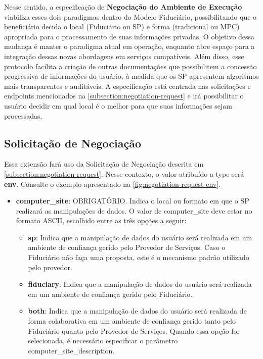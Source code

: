Nesse sentido, a especificação de \textbf{Negociação do Ambiente de Execução} viabiliza esses dois paradigmas dentro do Modelo Fiduciário, possibilitando que o beneficiário decida o local (Fiduciário ou \acs{SP}) e forma (tradicional ou \acs{MPC}) apropriada para o processamento de suas informações privadas. O objetivo dessa mudança é manter o paradigma atual em operação, enquanto abre espaço para a integração dessas novas abordagens em serviços compatíveis. Além disso, esse protocolo facilita a criação de outras documentações que possibilitem a concessão progressiva de informações do usuário, à medida que os \acs{SP} apresentem algoritmos mais transparentes e auditáveis. A especificação está centrada nas solicitações e endpoints mencionados na \autoref{subsection:negotiation-request} e irá possibilitar o usuário decidir em qual local é o melhor para que suas informações sejam processadas. 

\subsection{Solicitação de Negociação}

Essa extensão fará uso da Solicitação de Negociação descrita em \autoref{subsection:negotiation-request}. Nesse contexto, o valor atribuído a type será \textbf{env}. Consulte o exemplo apresentado na \autoref{fig:negotiation-request-env}.



\begin{itemize}

    \item \textbf{computer\_site}: OBRIGATÓRIO. Indica o local ou formato em que o \acs{SP} realizará as manipulações de dados. O valor de computer\_site deve estar no formato ASCII, escolhido entre as três opções a seguir:

    \begin{itemize}
    
        \item \textbf{sp}: Indica que a manipulação de dados do usuário será realizada em um ambiente de confiança gerido pelo Provedor de Serviços. Caso o Fiduciário não faça uma proposta, este é o mecanismo padrão utilizado pelo provedor.
        
        \item \textbf{fiduciary}: Indica que a manipulação de dados do usuário será realizada em um ambiente de confiança gerido pelo Fiduciário.
        
        \item \textbf{both}: Indica que a manipulação de dados do usuário será realizada de forma colaborativa em um ambiente de confiança gerido tanto pelo Fiduciário quanto pelo Provedor de Serviços. Quando essa opção for selecionada, é necessário especificar o parâmetro computer\_site\_description.
   
    \end{itemize}

\end{itemize}


